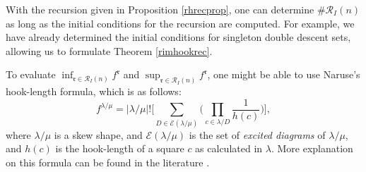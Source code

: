 \documentclass[11pt, a4paper, reqno]{article}
\numberwithin{equation}{section}
\theoremstyle{definition}
\begin{document}
	 With the recursion given in Proposition \ref{rhrecprop}, one can determine $\#\mathcal{R}_I(n)$ as long as the initial conditions for the recursion are computed. For example, we have already determined the initial conditions for singleton double descent sets, allowing us to formulate Theorem \ref{rimhookrec}.
	
	 To evaluate $ \inf_{\mathfrak{r}\in\mathcal{R}_I(n)}f^{\mathfrak{r}}$ and $\sup_{\mathfrak{r}\in\mathcal{R}_I(n)}f^{\mathfrak{r}}$, one might be able to use Naruse's hook-length formula, which is as follows: $$f^{\lambda/\mu} = |\lambda/\mu|!\Bigg[\sum_{D \in \mathcal{E}(\lambda/\mu)}\Bigg(\prod_{c \in \lambda/D}\dfrac{1}{h(c)}\Bigg)\Bigg],$$ where $\lambda/\mu$ is a skew shape, and $\mathcal{E}(\lambda/\mu)$ is the set of \textit{excited diagrams} of $\lambda/\mu$, and $h(c)$ is the hook-length of a square $c$ as calculated in $\lambda$. More explanation on this formula can be found in the literature \cite{idk2, idk1}.
    
\end{document}
